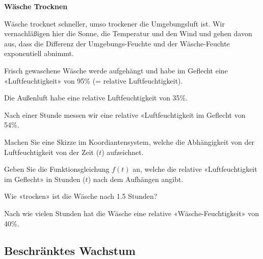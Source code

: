 \platzFuerBerechnungenBisEndeSeite{}





\bbwActAufgabenNr{} \textbf{Wäsche Trocknen}

Wäsche trocknet schneller, umso trockener die Umgebungsluft ist. Wir
vernachläßigen hier die Sonne, die Temperatur und den Wind und gehen
davon aus, dass die Differenz der Umgebungs-Feuchte und der
Wäsche-Feuchte exponentiell abnimmt.

Frisch gewaschene Wäsche werde aufgehängt und habe im Geflecht eine «Luftfeuchtigkeit» von 95\%
(= relative Luftfeuchtigkeit).

Die Außenluft habe eine relative Luftfeuchtigkeit von 35\%. 


Nach einer
Stunde messen wir eine relative «Luftfeuchtigkeit im Geflecht von
54\%.


\begin{bbwAufgabenBlock}
\item Machen Sie eine Skizze im Koordiantensystem, welche die
Abhängigkeit von der Luftfeuchtigkeit von der Zeit ($t$) aufzeichnet.


\item Geben Sie die Funktionsgleichung $f(t)$ an, welche die relative
«Luftfeuchtigkeit im Geflecht» in Stunden ($t$) nach dem Aufhängen
angibt.


\item Wie «trocken» ist die Wäsche nach 1.5 Stunden?


\item Nach wie vielen Stunden hat die Wäsche eine relative
«Wäsche-Feuchtigkeit» von 40\%.

\TRAINER{

$$f(t) = 35 + 60 \cdot \left( \frac{19}{60}\right)^t$$
$f(t) = 40[\%]$ einsetzen:

$$40 [\%| = 35 + 60 \cdot \left( \frac{19}{60}\right)^t$$
$$5 [\%| = 60 \cdot \left( \frac{19}{60}\right)^t$$
$$\frac5{60} [\%| =\left( \frac{19}{60}\right)^t$$
$$t = \log_{\frac{19}{60}}(\frac5{60}) \approx 2.16 [\textrm{h}]$$
}%

\end{bbwAufgabenBlock}


\platzFuerBerechnungenBisEndeSeite{}






\subsection{Beschränktes Wachstum}




